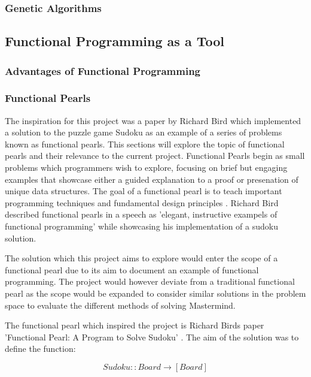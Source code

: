 \documentclass[12pt]{article}  %
\theoremstyle{definition}
\theoremstyle{remark}
\begin{document}
\subsubsection {Genetic Algorithms}


\subsection {Functional Programming as a Tool}

\subsubsection {Advantages of Functional Programming}

\subsubsection {Functional Pearls}
The inspiration for this project was a paper by Richard Bird which implemented a solution to the puzzle game Sudoku as an example of a series of problems known as functional pearls. This sections will explore the topic of functional pearls and their relevance to the current project. Functional Pearls begin as small problems which programmers wish to explore, focusing on brief but engaging examples that showcase either a guided explanation to a proof or presenation of unique data structures. The goal of a functional pearl is to teach important programming techniques and fundamental design principles \cite{Pearls}.  Richard Bird described functional pearls in a speech as 'elegant, instructive exampels of functional programming' while showcasing his implementation of a sudoku solution\cite {R. Bird Speech}.

The solution which this project aims to explore would enter the scope of a functional pearl due to its aim to document an example of functional programming. The project would however deviate from a traditional functional pearl as the scope would be expanded to consider similar solutions in the problem space to evaluate the different methods of solving Mastermind.

The functional pearl which inspired the project is Richard Birds paper 'Functional Pearl: A Program to Solve Sudoku' \cite{Sudoku}. The aim of the solution was to define the function:

\[ Sudoku :: Board \rightarrow [Board]\]
\end{document}
